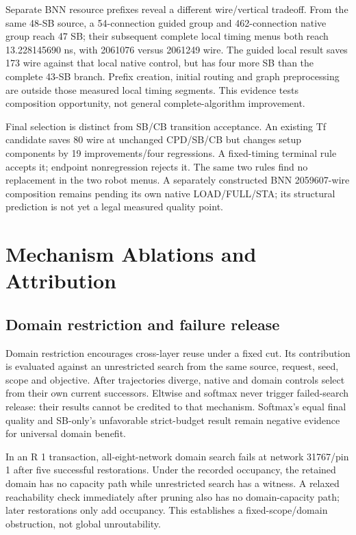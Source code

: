 \documentclass[conference,10pt]{IEEEtran}
\begin{document}
Separate BNN resource prefixes reveal a different wire/vertical tradeoff. From the same 48-SB source, a 54-connection guided group and 462-connection native group reach 47 SB; their subsequent complete local timing menus both reach 13.228145690 ns, with 2061076 versus 2061249 wire. The guided local result saves 173 wire against that local native control, but has four more SB than the complete 43-SB branch. Prefix creation, initial routing and graph preprocessing are outside those measured local timing segments. This evidence tests composition opportunity, not general complete-algorithm improvement.

Final selection is distinct from SB/CB transition acceptance. An existing Tf candidate saves 80 wire at unchanged CPD/SB/CB but changes setup components by 19 improvements/four regressions. A fixed-timing terminal rule accepts it; endpoint nonregression rejects it. The same two rules find no replacement in the two robot menus. A separately constructed BNN 2059607-wire composition remains pending its own native LOAD/FULL/STA; its structural prediction is not yet a legal measured quality point.
\section{Mechanism Ablations and Attribution}
\subsection{Domain restriction and failure release}
Domain restriction encourages cross-layer reuse under a fixed cut. Its contribution is evaluated against an unrestricted search from the same source, request, seed, scope and objective. After trajectories diverge, native and domain controls select from their own current successors. Eltwise and softmax never trigger failed-search release: their results cannot be credited to that mechanism. Softmax's equal final quality and SB-only's unfavorable strict-budget result remain negative evidence for universal domain benefit.

In an R 1 transaction, all-eight-network domain search fails at network 31767/pin 1 after five successful restorations. Under the recorded occupancy, the retained domain has no capacity path while unrestricted search has a witness. A relaxed reachability check immediately after pruning also has no domain-capacity path; later restorations only add occupancy. This establishes a fixed-scope/domain obstruction, not global unroutability.
\end{document}
